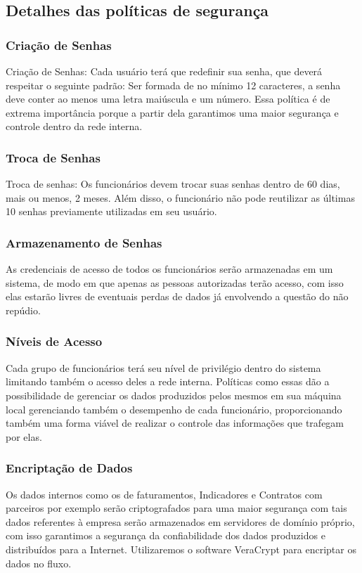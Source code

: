 \documentclass[12pt]{article}
\begin{document}
\subsection{Detalhes das políticas de segurança}
\subsubsection{Criação de Senhas}
Criação de Senhas: Cada usuário terá que redefinir sua senha, que deverá respeitar o seguinte padrão: Ser formada de no mínimo 12 caracteres, a senha deve conter ao menos uma letra maiúscula e um número. Essa política é de extrema importância porque a partir dela garantimos uma maior segurança e controle  dentro da rede interna.
\subsubsection{Troca de Senhas}
Troca de senhas: Os funcionários devem trocar suas senhas dentro de 60 dias, mais ou menos, 2 meses. Além disso, o funcionário não pode reutilizar as últimas 10 senhas previamente utilizadas em seu usuário.
\subsubsection{Armazenamento de Senhas}
As credenciais de acesso de todos os funcionários serão armazenadas em um sistema, de modo em que apenas as pessoas autorizadas terão acesso, com isso elas estarão livres de eventuais perdas de dados já envolvendo a questão do não repúdio.
\subsubsection{Níveis de Acesso}
Cada grupo de funcionários terá seu nível de privilégio dentro do sistema limitando também o acesso deles a rede interna. Políticas como essas dão a possibilidade de gerenciar os dados produzidos pelos mesmos em sua máquina local gerenciando também o desempenho de cada funcionário, proporcionando também uma forma viável de realizar o controle das informações que trafegam por elas.
\subsubsection{Encriptação de Dados}
Os dados internos como os de faturamentos, Indicadores e Contratos com parceiros por exemplo serão criptografados para uma maior segurança com tais dados referentes à empresa serão armazenados em servidores de domínio próprio, com isso garantimos a segurança da confiabilidade dos dados produzidos e distribuídos para a Internet. Utilizaremos o software VeraCrypt para encriptar os dados no fluxo.
\end{document}
